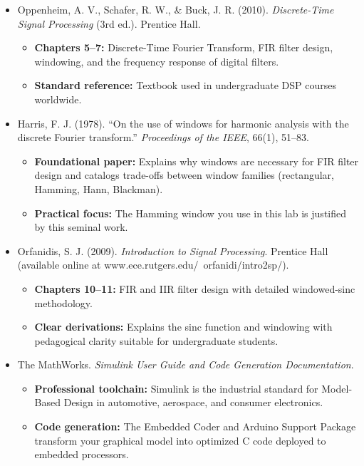 \documentclass[11pt,letterpaper]{article}
\begin{document}
\begin{itemize}
    \item Oppenheim, A. V., Schafer, R. W., \& Buck, J. R. (2010). \textit{Discrete-Time Signal Processing} (3rd ed.). Prentice Hall.
    \begin{itemize}
        \item \textbf{Chapters 5--7:} Discrete-Time Fourier Transform, FIR filter design, windowing, and the frequency response of digital filters.
        \item \textbf{Standard reference:} Textbook used in undergraduate DSP courses worldwide.
    \end{itemize}

    \item Harris, F. J. (1978). ``On the use of windows for harmonic analysis with the discrete Fourier transform.'' \textit{Proceedings of the IEEE}, 66(1), 51--83.
    \begin{itemize}
        \item \textbf{Foundational paper:} Explains why windows are necessary for FIR filter design and catalogs trade-offs between window families (rectangular, Hamming, Hann, Blackman).
        \item \textbf{Practical focus:} The Hamming window you use in this lab is justified by this seminal work.
    \end{itemize}

    \item Orfanidis, S. J. (2009). \textit{Introduction to Signal Processing}. Prentice Hall (available online at www.ece.rutgers.edu/~orfanidi/intro2sp/).
    \begin{itemize}
        \item \textbf{Chapters 10--11:} FIR and IIR filter design with detailed windowed-sinc methodology.
        \item \textbf{Clear derivations:} Explains the sinc function and windowing with pedagogical clarity suitable for undergraduate students.
    \end{itemize}

    \item The MathWorks. \textit{Simulink User Guide and Code Generation Documentation}.
    \begin{itemize}
        \item \textbf{Professional toolchain:} Simulink is the industrial standard for Model-Based Design in automotive, aerospace, and consumer electronics.
        \item \textbf{Code generation:} The Embedded Coder and Arduino Support Package transform your graphical model into optimized C code deployed to embedded processors.
    \end{itemize}


\end{itemize}
\end{document}
